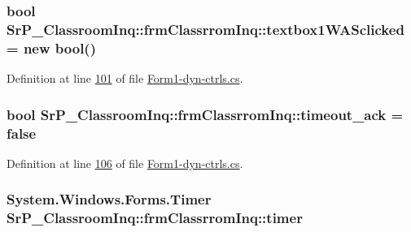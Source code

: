 \hypertarget{class_sr_p___classroom_inq_1_1frm_classrrom_inq_a998e499144884577e3445f4b721b4c6a}{
\subsubsection[{textbox1\-W\-A\-Sclicked}]{\setlength{\rightskip}{0pt plus 5cm}bool {\bf \-Sr\-P\-\_\-\-Classroom\-Inq\-::frm\-Classrrom\-Inq\-::textbox1\-W\-A\-Sclicked} = new bool()}}
\label{class_sr_p___classroom_inq_1_1frm_classrrom_inq_a998e499144884577e3445f4b721b4c6a}


\-Definition at line \hyperlink{_form1-dyn-ctrls_8cs_source_l00101}{101} of file \hyperlink{_form1-dyn-ctrls_8cs_source}{\-Form1-\/dyn-\/ctrls.\-cs}.

\hypertarget{class_sr_p___classroom_inq_1_1frm_classrrom_inq_a64cde7d8ac96b5122de783724c58103a}{
\subsubsection[{timeout\-\_\-ack}]{\setlength{\rightskip}{0pt plus 5cm}bool {\bf \-Sr\-P\-\_\-\-Classroom\-Inq\-::frm\-Classrrom\-Inq\-::timeout\-\_\-ack} = false}}
\label{class_sr_p___classroom_inq_1_1frm_classrrom_inq_a64cde7d8ac96b5122de783724c58103a}


\-Definition at line \hyperlink{_form1-dyn-ctrls_8cs_source_l00106}{106} of file \hyperlink{_form1-dyn-ctrls_8cs_source}{\-Form1-\/dyn-\/ctrls.\-cs}.

\hypertarget{class_sr_p___classroom_inq_1_1frm_classrrom_inq_ac5fec0fdbc135ddcefc976786801ee05}{
\subsubsection[{timer}]{\setlength{\rightskip}{0pt plus 5cm}\-System.\-Windows.\-Forms.\-Timer {\bf \-Sr\-P\-\_\-\-Classroom\-Inq\-::frm\-Classrrom\-Inq\-::timer}}}
\label{class_sr_p___classroom_inq_1_1frm_classrrom_inq_ac5fec0fdbc135ddcefc976786801ee05}


